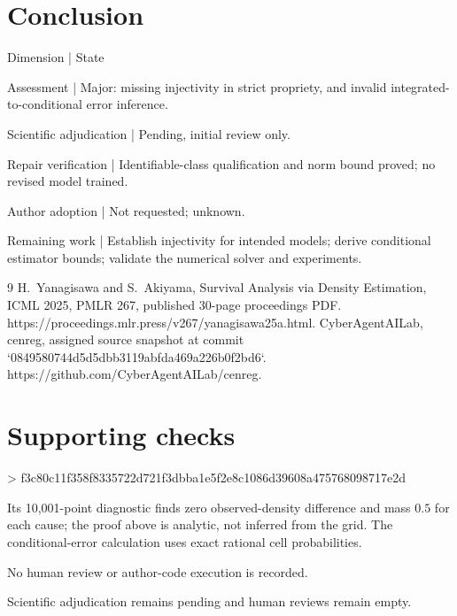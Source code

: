 \documentclass[10pt]{article}
\begin{document}
\section*{Conclusion}
Dimension | State\par
Assessment | Major: missing injectivity in strict propriety, and invalid integrated-to-conditional error inference.\par
Scientific adjudication | Pending, initial review only.\par
Repair verification | Identifiable-class qualification and norm bound proved; no revised model trained.\par
Author adoption | Not requested; unknown.\par
Remaining work | Establish injectivity for intended models; derive conditional estimator bounds; validate the numerical solver and experiments.\par
9 H. Yanagisawa and S. Akiyama, Survival Analysis via Density Estimation, ICML 2025, PMLR 267, published 30-page proceedings PDF. https://proceedings.mlr.press/v267/yanagisawa25a.html. CyberAgentAILab, cenreg, assigned source snapshot at commit `0849580744d5d5dbb3119abfda469a226b0f2bd6`. https://github.com/CyberAgentAILab/cenreg.\par
\section*{Supporting checks}
> f3c80c11f358f8335722d721f3dbba1e5f2e8c1086d39608a475768098717e2d\par
Its 10,001-point diagnostic finds zero observed-density difference and mass \(0.5\) for each cause; the proof above is analytic, not inferred from the grid. The conditional-error calculation uses exact rational cell probabilities.\par
No human review or author-code execution is recorded.\par
Scientific adjudication remains pending and human reviews remain empty.\par
\end{document}
